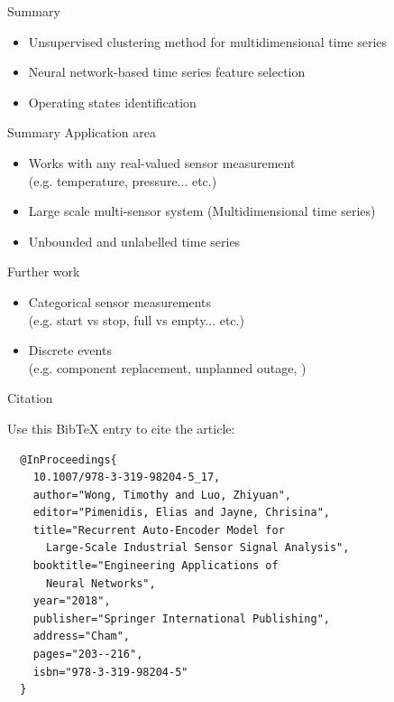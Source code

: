 \documentclass{beamer}
\begin{document}
\begin{frame}{Summary}
  \begin{itemize}
    \item Unsupervised clustering method for multidimensional time series
    \item Neural network-based time series feature selection
    \item Operating states identification
  \end{itemize}
\end{frame}

\begin{frame}{Summary}
  Application area
    \begin{itemize}
      \item Works with any real-valued sensor measurement 
        \\ (e.g. temperature, pressure... etc.)
      \item Large scale multi-sensor system (Multidimensional time series)
      \item Unbounded and unlabelled time series
    \end{itemize}
  Further work
    \begin{itemize}
      \item Categorical sensor measurements 
        \\(e.g. start vs stop, full vs empty... etc.)
      \item Discrete events 
        \\(e.g. component replacement, unplanned outage, )
    \end{itemize}
\end{frame}

\begin{frame}[fragile]{Citation}

Use this BibTeX entry to cite the article:

  \begin{scriptsize}
  \begin{lstlisting}
  @InProceedings{
    10.1007/978-3-319-98204-5_17,
    author="Wong, Timothy and Luo, Zhiyuan",
    editor="Pimenidis, Elias and Jayne, Chrisina",
    title="Recurrent Auto-Encoder Model for
      Large-Scale Industrial Sensor Signal Analysis",
    booktitle="Engineering Applications of
      Neural Networks",
    year="2018",
    publisher="Springer International Publishing",
    address="Cham",
    pages="203--216",
    isbn="978-3-319-98204-5"
  }
  \end{lstlisting}
  \end{scriptsize}
\end{frame}
\end{document}
